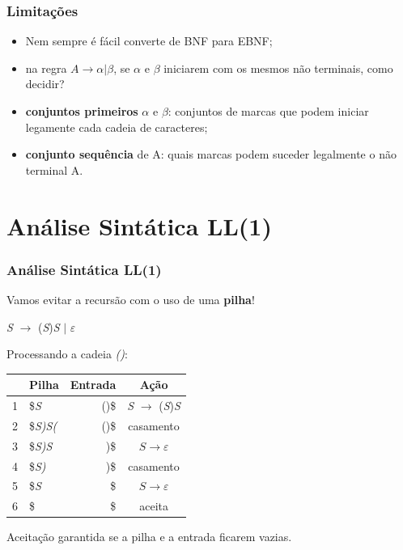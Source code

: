 \documentclass[table]{beamer}
\begin{document}
\begin{frame}
   \frametitle{Limitações}
   \begin{itemize}
      \item Nem sempre é fácil converte de BNF para EBNF;
      \item na regra $A\to \alpha | \beta$, se $\alpha$ e $\beta$ iniciarem com os mesmos não terminais, como decidir?
      \item \textbf{conjuntos primeiros} $\alpha$ e $\beta$: conjuntos de marcas que podem iniciar legamente cada cadeia de caracteres;
      \item \textbf{conjunto sequência} de A: quais marcas podem suceder legalmente o não terminal A.
   \end{itemize}
\end{frame}

\section{Análise Sintática LL(1)}
\begin{frame}
   \frametitle{Análise Sintática LL(1)}
   Vamos evitar a recursão com o uso de uma \textbf{pilha}! \\
   \begin{center}
   \textit{S} $\to$ (\textit{S})\textit{S} $|$ $\varepsilon$
   \end{center}
   Processando a cadeia \textit{()}:
   \begin{table}
      \begin{tabular}{c|l|r|c}
      & Pilha & Entrada & Ação \\
      \hline 
      1 & \$\textit{S}    & ()\$           & \textit{S} $\to$ (\textit{S})\textit{S}  \\
      2 & \$\textit{S)S(} & ()\$           & casamento      \\
      3 & \$\textit{S)S}  & )\$            & $S\to \varepsilon$      \\
      4 & \$\textit{S)}   & )\$            & casamento      \\
      5 & \$\textit{S}    & \$             & $S\to \varepsilon$      \\
      6 & \$              & \$             & aceita      \\
      \hline
      \end{tabular}
   \end{table}
   Aceitação garantida se a pilha e a entrada ficarem vazias.
\end{frame}
\end{document}
